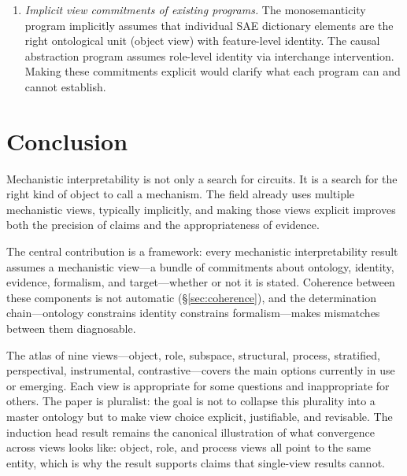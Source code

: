 \documentclass{article}
\begin{document}
\begin{enumerate}[leftmargin=*]
      safety-relevant inference?  The object view is likely insufficient---a
      head identified as safety-relevant on one distribution may not
      generalize.  The structural or stratified views may be necessary, but
      their evidential demands are currently impractical at scale.
\item \emph{Implicit view commitments of existing programs.}  The
      monosemanticity program \citep{bricken2023,templeton2024} implicitly
      assumes that individual SAE dictionary elements are the right ontological
      unit (object view) with feature-level identity.  The causal abstraction
      program \citep{geiger2021,geiger2024} assumes role-level identity via
      interchange intervention.  Making these commitments explicit would
      clarify what each program can and cannot establish.
\end{enumerate}

\section{Conclusion}

Mechanistic interpretability is not only a search for circuits.  It is
a search for the right kind of object to call a mechanism.  The field
already uses multiple mechanistic views, typically implicitly, and making
those views explicit improves both the precision of claims and the
appropriateness of evidence.

The central contribution is a framework: every mechanistic
interpretability result assumes a mechanistic view---a bundle of
commitments about ontology, identity, evidence, formalism, and
target---whether or not it is stated.  Coherence between these
components is not automatic (\S\ref{sec:coherence}), and the
determination chain---ontology constrains identity constrains
formalism---makes mismatches between them diagnosable.

The atlas of nine views---object, role, subspace, structural, process,
stratified, perspectival, instrumental, contrastive---covers the main
options currently in use or emerging.  Each view is appropriate for some
questions and inappropriate for others.  The paper is pluralist: the
goal is not to collapse this plurality into a master ontology but to
make view choice explicit, justifiable, and revisable.  The induction
head result remains the canonical illustration of what convergence
across views looks like: object, role, and process views all point to
the same entity, which is why the result supports claims that
single-view results cannot.
\end{document}
